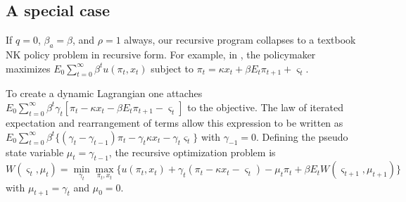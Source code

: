 \documentclass[12pt,letter,leqno]{article}
\theoremstyle{asn}
\theoremstyle{lem}
\theoremstyle{slem}
\theoremstyle{prop}
\theoremstyle{appprop}
\theoremstyle{rem}
\theoremstyle{defn}
\begin{document}
\subsection{A special case}\label{specialcase}

If $q=0$, $\beta_a=\beta$, and $\rho=1$ always, our recursive program collapses to a textbook NK policy problem in recursive form. For example, in \cite{clarida_science_1999}, the policymaker maximizes $E_{0}\sum_{t=0}^{\infty
}\beta ^{t}u(\pi _{t},x_{t})$ subject to $\pi _{t}=\kappa x_{t}+\beta
E_{t}\pi _{t+1}+\varsigma _{t}$.

To create a dynamic Lagrangian one attaches   
$ E_{0}\sum_{t=0}^{\infty }\beta ^{t}\gamma_{t}[\pi _{t}-\kappa x_{t}-\beta
E_{t}\pi_{t+1}-\varsigma_{t}]$ 
to the objective. The law of iterated expectation and rearrangement of terms allow this expression to be written as $E_{0}\sum_{t=0}^{\infty }\beta^{t}\{(\gamma_{t}-\gamma _{t-1})\pi
_{t}-\gamma_{t}\kappa x_{t}-\gamma_{t}\varsigma_{t}\}$
with $\gamma_{-1}=0$. Defining the pseudo state variable $\mu_{t}=\gamma_{t-1}$, the recursive
optimization problem is
\begin{equation*}
W(\varsigma_{t},\mu_{t})=\min_{\gamma_{t}}\max_{\pi_{t},x_{t}}\{u(\pi_{t},x_{t})+\gamma_{t}(\pi_{t}-\kappa x_{t}-\varsigma_{t})-\mu_{t}\pi _{t}+\beta E_{t}W(\varsigma_{t+1},\mu_{t+1})\}
\end{equation*}
with $\mu_{t+1}=\gamma_{t}$ and $\mu_0=0$. 
\end{document}
